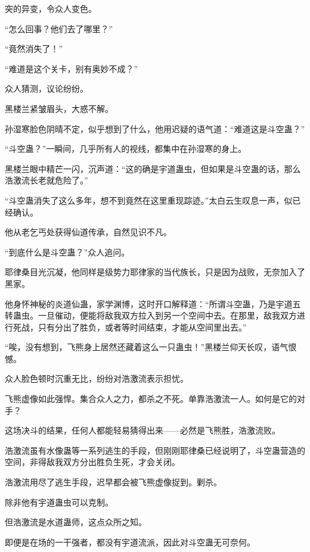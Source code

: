 
\begin{this_body}



突的异变，令众人变色。

“怎么回事？他们去了哪里？”

“竟然消失了！”

“难道是这个关卡，别有奥妙不成？”

众人猜测，议论纷纷。

黑楼兰紧皱眉头，大惑不解。

孙湿寒脸色阴晴不定，似乎想到了什么，他用迟疑的语气道：“难道这是斗空蛊？”

“斗空蛊？”一瞬间，几乎所有人的视线，都集中在孙湿寒的身上。

黑楼兰眼中精芒一闪，沉声道：“这的确是宇道蛊虫，但如果是斗空蛊的话，那么浩激流长老就危险了。”

“斗空蛊消失了这么多年，想不到竟然在这里重现踪迹。”太白云生叹息一声，似已经确认。

他从老乞丐处获得仙道传承，自然见识不凡。

“到底什么是斗空蛊？”众人追问。

耶律桑目光沉凝，他同样是级势力耶律家的当代族长，只是因为战败，无奈加入了黑家。

他身怀神秘的炎道仙蛊，家学渊博，这时开口解释道：“所谓斗空蛊，乃是宇道五转蛊虫。一旦催动，便能将敌我双方拉入到另一个空间中去。在那里，敌我双方进行死战，只有分出了胜负，或者等时间结束，才能从空间里出去。”

“唉，没有想到，飞熊身上居然还藏着这么一只蛊虫！”黑楼兰仰天长叹，语气恨憾。

众人脸色顿时沉重无比，纷纷对浩激流表示担忧。

飞熊虚像如此强悍。集合众人之力，都杀之不死。单靠浩激流一人。如何是它的对手？

这场决斗的结果，任何人都能轻易猜得出来——必然是飞熊胜，浩激流败。

浩激流虽有水像蛊等一系列逃生的手段，但刚刚耶律桑已经说明了，斗空蛊营造的空间，非得敌我双方分出胜负生死，才会关闭。

浩激流用尽了逃生手段，迟早都会被飞熊虚像捉到。剿杀。

除非他有宇道蛊虫可以克制。

但浩激流是水道蛊师，这点众所之知。

即便是在场的一干强者，都没有宇道流派，因此对斗空蛊无可奈何。


\end{this_body}
